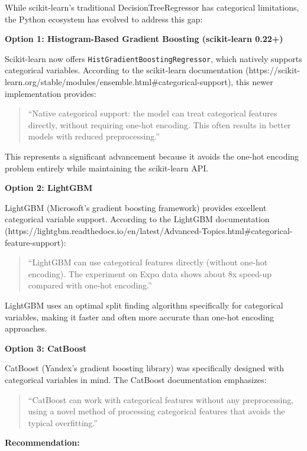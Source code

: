 \documentclass[
  letterpaper,
  DIV=11,
  numbers=noendperiod]{scrartcl}
\begin{document}
While scikit-learn's traditional DecisionTreeRegressor has categorical
limitations, the Python ecosystem has evolved to address this gap:

\textbf{Option 1: Histogram-Based Gradient Boosting (scikit-learn
0.22+)}

Scikit-learn now offers \texttt{HistGradientBoostingRegressor}, which
natively supports categorical variables. According to the scikit-learn
documentation
(https://scikit-learn.org/stable/modules/ensemble.html\#categorical-support),
this newer implementation provides:

\begin{quote}
``Native categorical support: the model can treat categorical features
directly, without requiring one-hot encoding. This often results in
better models with reduced preprocessing.''
\end{quote}

This represents a significant advancement because it avoids the one-hot
encoding problem entirely while maintaining the scikit-learn API.

\textbf{Option 2: LightGBM}

LightGBM (Microsoft's gradient boosting framework) provides excellent
categorical variable support. According to the LightGBM documentation
(https://lightgbm.readthedocs.io/en/latest/Advanced-Topics.html\#categorical-feature-support):

\begin{quote}
``LightGBM can use categorical features directly (without one-hot
encoding). The experiment on Expo data shows about 8x speed-up compared
with one-hot encoding.''
\end{quote}

LightGBM uses an optimal split finding algorithm specifically for
categorical variables, making it faster and often more accurate than
one-hot encoding approaches.

\textbf{Option 3: CatBoost}

CatBoost (Yandex's gradient boosting library) was specifically designed
with categorical variables in mind. The CatBoost documentation
emphasizes:

\begin{quote}
``CatBoost can work with categorical features without any preprocessing,
using a novel method of processing categorical features that avoids the
typical overfitting.''
\end{quote}

\textbf{Recommendation:}
\end{document}
